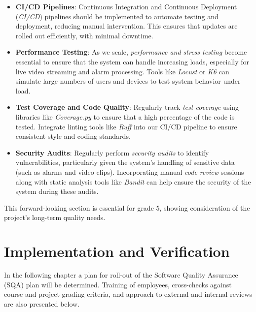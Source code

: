 \documentclass{article}
\begin{document}
\begin{itemize}
    \item \textbf{CI/CD Pipelines}: Continuous Integration and Continuous Deployment (\textit{CI/CD}) pipelines should be implemented to automate testing and deployment, reducing manual intervention. This ensures that updates are rolled out efficiently, with minimal downtime.
    \item \textbf{Performance Testing}: As we scale, \textit{performance and stress testing} become essential to ensure that the system can handle increasing loads, especially for live video streaming and alarm processing. Tools like \textit{Locust} or \textit{K6} can simulate large numbers of users and devices to test system behavior under load.
    \item \textbf{Test Coverage and Code Quality}: Regularly track \textit{test coverage} using libraries like \textit{Coverage.py} to ensure that a high percentage of the code is tested. Integrate linting tools like \textit{Ruff} into our CI/CD pipeline to ensure consistent style and coding standards.
    \item \textbf{Security Audits}: Regularly perform \textit{security audits} to identify vulnerabilities, particularly given the system's handling of sensitive data (such as alarms and video clips). Incorporating manual \textit{code review} sessions along with static analysis tools like \textit{Bandit} can help ensure the security of the system during these audits.
\end{itemize}


This forward-looking section is essential for grade 5, showing consideration of the project's long-term quality needs.

\newpage
\section{Implementation and Verification}
In the following chapter a plan for roll-out of the Software Quality Assurance (SQA) plan will be determined. Training of employees, cross-checks against course and project grading criteria, and approach to external and internal reviews are also presented below. 
\end{document}
